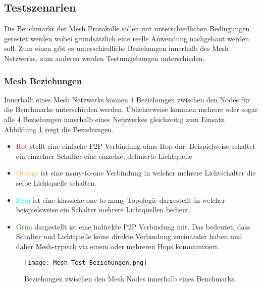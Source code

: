 \subsection{Testszenarien}\label{subsec:TestszenarienMesh}

Die Benchmarks der Mesh Protokolle sollen mit unterschiedlichen Bedingungen getestet werden wobei grundsätzlich eine reelle Anwendung nachgebaut werden soll. Zum einen gibt es unterschiedliche Beziehungen innerhalb des Mesh Netzwerks, zum anderen werden Testumgebungen unterschieden.

\subsubsection{Mesh Beziehungen}\label{subsubsec:MeshBeziehungen}


Innerhalb eines Mesh Netzwerks können 4 Beziehungen zwischen den Nodes für die Benchmarks unterschieden werden. Üblicherweise kommen mehrere oder sogar alle 4 Beziehungen innerhalb eines Netzwerkes gleichzeitig zum Einsatz. Abbildung \ref{fig:MeshTestBeziehungen} zeigt die Beziehungen.

\begin{itemize}
 	\item \textcolor{red}{Rot} stellt eine einfache P2P Verbindung ohne Hop dar. Beispielweise schaltet ein einzelner Schalter eine einzelne, definierte Lichtquelle
 	\item \textcolor{orange}{Orange} ist eine many-to-one Verbindung in welcher mehrere Lichtschalter die selbe Lichtquelle schalten.
 	\item \textcolor{cyan}{Blau} ist eine klassiche one-to-many Topologie dargestellt in welcher beispielsweise ein Schalter mehrere Lichtquellen bedient.
 	 \item \textcolor{green}{Grün} dargestellt ist eine indirekte P2P Verbindung mit. Das bedeutet, dass Schalter und Lichtquelle keine direkte Verbindung zueinander haben und daher Mesh-typisch via einem oder mehreren Hops kommuniziert.
\end{itemize}


\begin{figure}[H]
	\centering
	\texttt{[image: Mesh\_Test\_Beziehungen.png]}
	\caption{Beziehungen zwischen den Mesh Nodes innerhalb eines Benchmarks.}\label{fig:MeshTestBeziehungen}
\end{figure}


